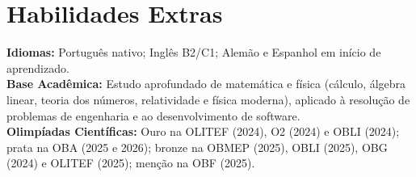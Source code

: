 \documentclass[letterpaper,11pt]{article}
\begin{document}
\section{Habilidades Extras}
\begin{itemize}[leftmargin=0.15in, label={}]
\small{\item{
 \textbf{Idiomas:} Português nativo; Inglês B2/C1; Alemão e Espanhol em início de aprendizado. \\

 \textbf{Base Acadêmica:} Estudo aprofundado de matemática e física (cálculo, álgebra linear, teoria dos números, relatividade e física moderna), aplicado à resolução de problemas de engenharia e ao desenvolvimento de software. \\

 \textbf{Olimpíadas Científicas:} Ouro na OLITEF (2024), O2 (2024) e OBLI (2024); prata na OBA (2025 e 2026); bronze na OBMEP (2025), OBLI (2025), OBG (2024) e OLITEF (2025); menção na OBF (2025). \\
}}
\end{itemize}
\end{document}
